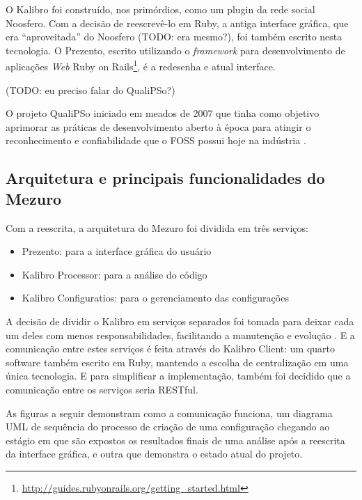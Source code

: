 
O Kalibro foi construído, nos primórdios, como um plugin da rede social
Noosfero. Com a decisão de reescrevê-lo em Ruby, a antiga interface gráfica,
que era ``aproveitada'' do Noosfero (TODO: era mesmo?), foi também escrito nesta
tecnologia. O Prezento, escrito utilizando o \textit{framework} para
desenvolvimento de aplicações \textit{Web} Ruby on Rails\footnote{\url{http://guides.rubyonrails.org/getting_started.html}},
é a redesenha e atual interface.


(TODO: eu preciso falar do QualiPSo?)

O projeto QualiPSo iniciado em meados de 2007 que tinha como objetivo aprimorar
as práticas de desenvolvimento aberto à época para atingir o reconhecimento e
confiabilidade que o FOSS possui hoje na indústria \cite{messias2012}. 

\subsection{Arquitetura e principais funcionalidades do Mezuro}

Com a reescrita, a arquitetura do Mezuro foi dividida em três serviços:

\begin{itemize}
  \item Prezento: para a interface gráfica do usuário
  \item Kalibro Processor: para a análise do código
  \item Kalibro Configuratios: para o gerenciamento das configurações
\end{itemize}

A decisão de dividir o Kalibro em serviços separados foi tomada para deixar
cada um deles com menos responsabilidades, facilitando a manutenção e evolução
\cite{camarinhaOSS2015}. E a comunicação entre estes serviços é feita através
do Kalibro Client: um quarto software também escrito em Ruby, mantendo a
escolha de centralização em uma única tecnologia. E para simplificar a
implementação, também foi decidido que a comunicação entre os serviços seria
RESTful.

As figuras a seguir demonstram como a comunicação funciona, um diagrama UML de
sequência do processo de criação de uma configuração chegando ao estágio em que
são expostos os resultados finais de uma análise após a reescrita da interface
gráfica, e outra que demonstra o estado atual do projeto.

